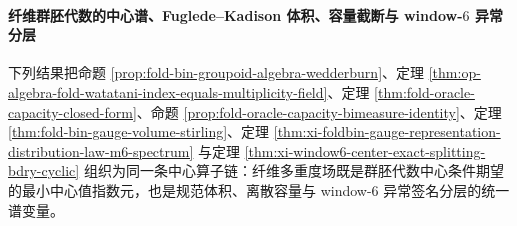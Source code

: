 \paragraph{纤维群胚代数的中心谱、Fuglede--Kadison 体积、容量截断与 window-\texorpdfstring{$6$}{6} 异常分层}
下列结果把命题 \ref{prop:fold-bin-groupoid-algebra-wedderburn}、定理
\ref{thm:op-algebra-fold-watatani-index-equals-multiplicity-field}、定理
\ref{thm:fold-oracle-capacity-closed-form}、命题
\ref{prop:fold-oracle-capacity-bimeasure-identity}、定理
\ref{thm:fold-bin-gauge-volume-stirling}、定理
\ref{thm:xi-foldbin-gauge-representation-distribution-law-m6-spectrum} 与定理
\ref{thm:xi-window6-center-exact-splitting-bdry-cyclic} 组织为同一条中心算子链：纤维多重度场既是群胚代数中心条件期望的最小中心值指数元，也是规范体积、离散容量与
window-\(6\) 异常签名分层的统一谱变量。

